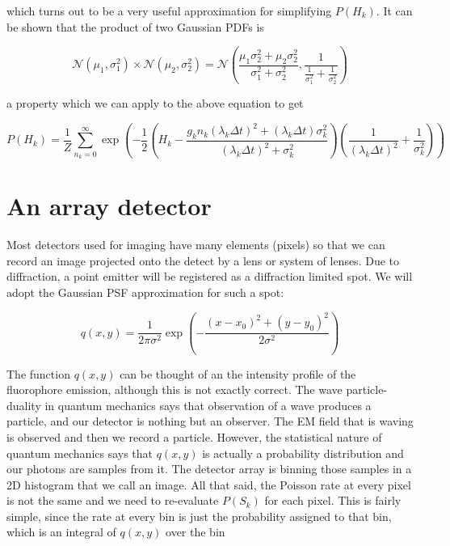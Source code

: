 \documentclass{article}
\begin{document}
which turns out to be a very useful approximation for simplifying $P(H_{k})$. It can be shown that the product of two Gaussian PDFs is

\begin{equation*}
\mathcal{N}(\mu_{1},\sigma_{1}^{2}) \times \mathcal{N}(\mu_{2},\sigma_{2}^{2}) = \mathcal{N}\left(\frac{\mu_{1}\sigma_{2}^{2} + \mu_{2}\sigma_{2}^{2}}{\sigma_{1}^{2}+\sigma_{2}^{2}}, \frac{1}{\frac{1}{\sigma_{1}^{2}}+\frac{1}{\sigma_{2}^{2}}}\right)
\end{equation*}

a property which we can apply to the above equation to get

\begin{equation*}
P(H_{k}) = \frac{1}{Z}\sum_{n_{k}=0}^{\infty}\exp\left(-\frac{1}{2}\left(H_{k}-\frac{g_{k}n_{k}(\lambda_{k}\Delta t)^{2} +  (\lambda_{k}\Delta t)\sigma_{k}^{2}}{(\lambda_{k}\Delta t)^{2}+\sigma_{k}^{2}}\right)\left(\frac{1}{(\lambda_{k}\Delta t)^{2}}+\frac{1}{\sigma_{k}^{2}}\right)\right)
\end{equation*}

\section{An array detector}

Most detectors used for imaging have many elements (pixels) so that we can record an image projected onto the detect by a lens or system of lenses. Due to diffraction, a point emitter will be registered as a diffraction limited spot. We will adopt the Gaussian PSF approximation for such a spot:

\begin{equation*}
q(x,y) = \frac{1}{2\pi\sigma^{2}}\exp\left(-\frac{(x-x_{0})^{2}+(y-y_{0})^{2}}{2\sigma^{2}}\right)
\end{equation*}

The function $q(x,y)$ can be thought of an the intensity profile of the fluorophore emission, although this is not exactly correct. The wave particle-duality in quantum mechanics says that observation of a wave produces a particle, and our detector is nothing but an observer. The EM field that is waving is observed and then we record a particle. However, the statistical nature of quantum mechanics says that $q(x,y)$ is actually a probability distribution and our photons are samples from it. The detector array is binning those samples in a 2D histogram that we call an image. All that said, the Poisson rate at every pixel is not the same and we need to re-evaluate $P(S_{k})$ for each pixel. This is fairly simple, since the rate at every bin is just the probability assigned to that bin, which is an integral of $q(x,y)$ over the bin
\end{document}
